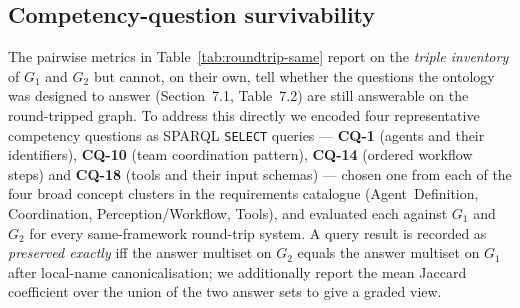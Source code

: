 \subsection{Competency-question survivability}\label{sec:cq-survivability}

The pairwise metrics in Table~\ref{tab:roundtrip-same} report on the
\emph{triple inventory} of $G_1$ and $G_2$ but cannot, on their own,
tell whether the questions the ontology was designed to answer
(Section~7.1, Table~7.2) are still answerable on the round-tripped
graph. To address this directly we encoded four representative
competency questions as SPARQL \texttt{SELECT} queries —
\textbf{CQ-1} (agents and their identifiers), \textbf{CQ-10} (team
coordination pattern), \textbf{CQ-14} (ordered workflow steps) and
\textbf{CQ-18} (tools and their input schemas) — chosen one from each
of the four broad concept clusters in the requirements catalogue
(Agent~Definition, Coordination, Perception/Workflow, Tools), and
evaluated each against $G_1$ and $G_2$ for every same-framework
round-trip system. A query result is recorded as \emph{preserved
exactly} iff the answer multiset on $G_2$ equals the answer multiset
on $G_1$ after local-name canonicalisation; we additionally report the
mean Jaccard coefficient over the union of the two answer sets to give
a graded view.

\begin{table}[ht]
  \centering
  \small
  \caption{Competency-question survivability across the 18-system
           same-framework round-trip. \emph{Exact} is the fraction
           of systems in which the SPARQL answer multiset on $G_2$
           equals the multiset on $G_1$ after local-name
           canonicalisation; \emph{Mean Jaccard} is the average
           overlap over the union of answer sets.}
  \label{tab:cq-survivability}
\end{table}

